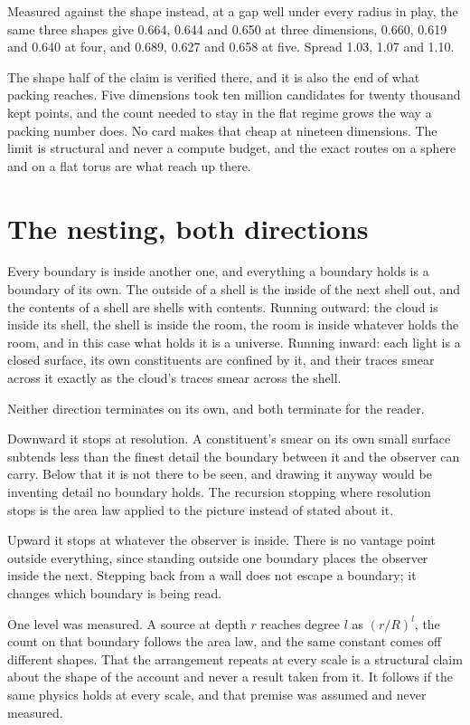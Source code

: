 Measured against the shape instead, at a gap well under every radius in play, the same three shapes
give 0.664, 0.644 and 0.650 at three dimensions, 0.660, 0.619 and 0.640 at four, and 0.689, 0.627
and 0.658 at five. Spread 1.03, 1.07 and 1.10.

The shape half of the claim is verified there, and it is also the end of what packing reaches. Five
dimensions took ten million candidates for twenty thousand kept points, and the count needed to stay
in the flat regime grows the way a packing number does. No card makes that cheap at nineteen
dimensions. The limit is structural and never a compute budget, and the exact routes on a sphere and
on a flat torus are what reach up there.

\section{The nesting, both directions}

Every boundary is inside another one, and everything a boundary holds is a boundary of its own. The
outside of a shell is the inside of the next shell out, and the contents of a shell are shells with
contents. Running outward: the cloud is inside its shell, the shell is inside the room, the room is
inside whatever holds the room, and in this case what holds it is a universe. Running inward: each
light is a closed surface, its own constituents are confined by it, and their traces smear across it
exactly as the cloud's traces smear across the shell.

Neither direction terminates on its own, and both terminate for the reader.

Downward it stops at resolution. A constituent's smear on its own small surface subtends less than
the finest detail the boundary between it and the observer can carry. Below that it is not there
to be seen, and drawing it anyway would be inventing detail no boundary holds. The recursion
stopping where resolution stops is the area law applied to the picture instead of stated about it.

Upward it stops at whatever the observer is inside. There is no vantage point outside everything,
since standing outside one boundary places the observer inside the next. Stepping back from a wall
does not escape a boundary; it changes which boundary is being read.

One level was measured. A source at depth $r$ reaches degree $l$ as $(r/R)^l$, the count on that
boundary follows the area law, and the same constant comes off different shapes. That the
arrangement repeats at every scale is a structural claim about the shape of the account and never a
result taken from it. It follows if the same physics holds at every scale, and that premise was
assumed and never measured.


